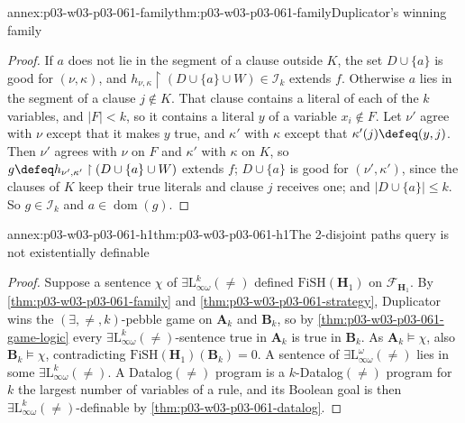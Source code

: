 \begin{annexitem}{annex:p03-w03-p03-061-family}{thm:p03-w03-p03-061-family}{Duplicator's winning family}
\begin{proof}
If \(a\) does not lie in the segment of a clause outside \(K\), the set
\(D\cup\{a\}\) is good for \((\nu,\kappa)\), and
\(h_{\nu,\kappa}\restriction(D\cup\{a\}\cup W)\in\mathcal I_k\) extends
\(f\). Otherwise \(a\) lies in the segment of a clause \(j\notin K\). That
clause contains a literal of each of the \(k\) variables, and \(|F|<k\), so it
contains a literal \(y\) of a variable \(x_i\notin F\). Let \(\nu'\) agree
with \(\nu\) except that it makes \(y\) true, and \(\kappa'\) with \(\kappa\)
except that \(\kappa'(j)\defeq(y,j)\). Then \(\nu'\) agrees with \(\nu\) on
\(F\) and \(\kappa'\) with \(\kappa\) on \(K\), so
\(g\defeq h_{\nu',\kappa'}\restriction(D\cup\{a\}\cup W)\) extends \(f\);
\(D\cup\{a\}\) is good for \((\nu',\kappa')\), since the clauses of \(K\)
keep their true literals and clause \(j\) receives one; and
\(|D\cup\{a\}|\le k\). So \(g\in\mathcal I_k\) and \(a\in\operatorname{dom}(g)\).
\end{proof}
\end{annexitem}

\begin{annexitem}{annex:p03-w03-p03-061-h1}{thm:p03-w03-p03-061-h1}{The 2-disjoint paths query is not existentially definable}
\begin{proof}
Suppose a sentence \(\chi\) of \(\exists\mathrm L^k_{\infty\omega}(\neq)\)
defined \(\mathrm{FiSH}(\mathbf H_1)\) on \(\mathcal F_{\mathbf H_1}\). By
\cref{thm:p03-w03-p03-061-family} and \cref{thm:p03-w03-p03-061-strategy},
Duplicator wins the \((\exists,\neq,k)\)-pebble game on \(\mathbf A_k\) and
\(\mathbf B_k\), so by \cref{thm:p03-w03-p03-061-game-logic} every
\(\exists\mathrm L^k_{\infty\omega}(\neq)\)-sentence true in \(\mathbf A_k\)
is true in \(\mathbf B_k\). As \(\mathbf A_k\models\chi\), also
\(\mathbf B_k\models\chi\), contradicting
\(\mathrm{FiSH}(\mathbf H_1)(\mathbf B_k)=0\). A sentence of
\(\exists\mathrm L^\omega_{\infty\omega}(\neq)\) lies in some
\(\exists\mathrm L^k_{\infty\omega}(\neq)\). A Datalog\((\neq)\) program is a
\(k\)-Datalog\((\neq)\) program for \(k\) the largest number of variables of
a rule, and its Boolean goal is then
\(\exists\mathrm L^k_{\infty\omega}(\neq)\)-definable by
\cref{thm:p03-w03-p03-061-datalog}.
\end{proof}
\end{annexitem}


